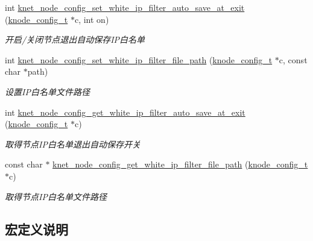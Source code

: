 \begin{DoxyCompactItemize}
int \hyperlink{a00104_ad81fc1af6cb037ce2a6b36bc6e34a8f9_ad81fc1af6cb037ce2a6b36bc6e34a8f9}{knet\+\_\+node\+\_\+config\+\_\+set\+\_\+white\+\_\+ip\+\_\+filter\+\_\+auto\+\_\+save\+\_\+at\+\_\+exit} (\hyperlink{a00066_af1cfaee0eb1c76ebf06076b95cc47ee1_af1cfaee0eb1c76ebf06076b95cc47ee1}{knode\+\_\+config\+\_\+t} $\ast$c, int on)
\begin{DoxyCompactList}\small\item\em 开启/关闭节点退出自动保存\+I\+P白名单 \end{DoxyCompactList}\item 
int \hyperlink{a00104_af15c35a97f4067e5285c1ade6bd6cfaf_af15c35a97f4067e5285c1ade6bd6cfaf}{knet\+\_\+node\+\_\+config\+\_\+set\+\_\+white\+\_\+ip\+\_\+filter\+\_\+file\+\_\+path} (\hyperlink{a00066_af1cfaee0eb1c76ebf06076b95cc47ee1_af1cfaee0eb1c76ebf06076b95cc47ee1}{knode\+\_\+config\+\_\+t} $\ast$c, const char $\ast$path)
\begin{DoxyCompactList}\small\item\em 设置\+I\+P白名单文件路径 \end{DoxyCompactList}\item 
int \hyperlink{a00104_affa14ee8a62155ff27a1e49e09ae3779_affa14ee8a62155ff27a1e49e09ae3779}{knet\+\_\+node\+\_\+config\+\_\+get\+\_\+white\+\_\+ip\+\_\+filter\+\_\+auto\+\_\+save\+\_\+at\+\_\+exit} (\hyperlink{a00066_af1cfaee0eb1c76ebf06076b95cc47ee1_af1cfaee0eb1c76ebf06076b95cc47ee1}{knode\+\_\+config\+\_\+t} $\ast$c)
\begin{DoxyCompactList}\small\item\em 取得节点\+I\+P白名单退出自动保存开关 \end{DoxyCompactList}\item 
const char $\ast$ \hyperlink{a00104_a9988701f828169b05138ec5cfd7b2016_a9988701f828169b05138ec5cfd7b2016}{knet\+\_\+node\+\_\+config\+\_\+get\+\_\+white\+\_\+ip\+\_\+filter\+\_\+file\+\_\+path} (\hyperlink{a00066_af1cfaee0eb1c76ebf06076b95cc47ee1_af1cfaee0eb1c76ebf06076b95cc47ee1}{knode\+\_\+config\+\_\+t} $\ast$c)
\begin{DoxyCompactList}\small\item\em 取得节点\+I\+P白名单文件路径 \end{DoxyCompactList}\end{DoxyCompactItemize}


\subsection{宏定义说明}
\hypertarget{a00104_af589e30e64a38f5efe59caad930a3f52_af589e30e64a38f5efe59caad930a3f52}{}
